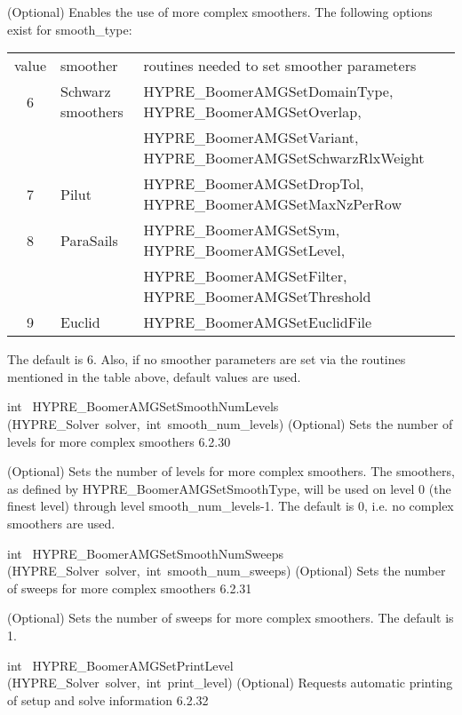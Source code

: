 \documentclass{article}
\begin{document}
\begin{cxxentry}
\begin{cxxentry}
\begin{cxxfunction}
\begin{cxxdoc}
(Optional) Enables the use of more complex smoothers.
The following options exist for smooth\_type:

\begin{tabular}{|c|l|l|} \hline
value & smoother & routines needed to set smoother parameters \\
6 &	Schwarz smoothers & HYPRE\_BoomerAMGSetDomainType, HYPRE\_BoomerAMGSetOverlap, \\
&  & HYPRE\_BoomerAMGSetVariant, HYPRE\_BoomerAMGSetSchwarzRlxWeight \\
7 &	Pilut & HYPRE\_BoomerAMGSetDropTol, HYPRE\_BoomerAMGSetMaxNzPerRow \\
8 &	ParaSails & HYPRE\_BoomerAMGSetSym, HYPRE\_BoomerAMGSetLevel, \\
&  &  HYPRE\_BoomerAMGSetFilter, HYPRE\_BoomerAMGSetThreshold \\
9 &	Euclid & HYPRE\_BoomerAMGSetEuclidFile \\
\hline
\end{tabular}

The default is 6. Also, if no smoother parameters are set via the routines mentioned in the table above,
default values are used.
\end{cxxdoc}
\end{cxxfunction}
\begin{cxxfunction}
{int\ }
        {HYPRE\_BoomerAMGSetSmoothNumLevels}
        {(HYPRE\_Solver\ solver,\ int\ smooth\_num\_levels)}
        {
(Optional) Sets the number of levels for more complex smoothers}
        {6.2.30}
\begin{cxxdoc}

(Optional) Sets the number of levels for more complex smoothers.
The smoothers, 
as defined by HYPRE\_BoomerAMGSetSmoothType, will be used
on level 0 (the finest level) through level smooth\_num\_levels-1. 
The default is 0, i.e. no complex smoothers are used.
\end{cxxdoc}
\end{cxxfunction}
\begin{cxxfunction}
{int\ }
        {HYPRE\_BoomerAMGSetSmoothNumSweeps}
        {(HYPRE\_Solver\ solver,\ int\ smooth\_num\_sweeps)}
        {
(Optional) Sets the number of sweeps for more complex smoothers}
        {6.2.31}
\begin{cxxdoc}

(Optional) Sets the number of sweeps for more complex smoothers.
The default is 1.
\end{cxxdoc}
\end{cxxfunction}
\begin{cxxfunction}
{int\ }
        {HYPRE\_BoomerAMGSetPrintLevel}
        {(HYPRE\_Solver\ solver,\ int\ print\_level)}
        {
(Optional) Requests automatic printing of setup and solve information}
        {6.2.32}
\begin{cxxdoc}


\end{cxxdoc}
\end{cxxfunction}
\end{cxxentry}
\end{cxxentry}
\end{document}
